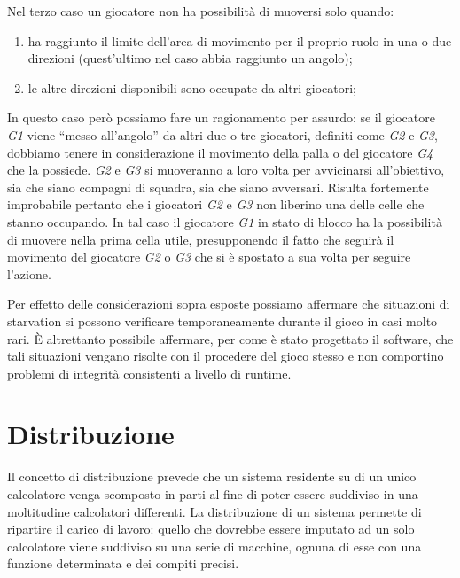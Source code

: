 \documentclass[aps,letterpaper,10pt]{article}
\begin{document}
Nel terzo caso un giocatore non ha possibilit\`a di muoversi solo quando:

\begin{enumerate}
	\item ha raggiunto il limite dell'area di movimento per il proprio ruolo in una o due direzioni (quest'ultimo nel caso abbia raggiunto un angolo);
	\item le altre direzioni disponibili sono occupate da altri giocatori; 
\end{enumerate}

In questo caso per\`o possiamo fare un ragionamento per assurdo: se il giocatore \emph{G1} viene ``messo all'angolo'' da altri due o tre giocatori, definiti come \emph{G2} e \emph{G3}, dobbiamo tenere in considerazione il movimento della palla o del giocatore \emph{G4} che la possiede. \emph{G2} e \emph{G3} si muoveranno a loro volta per avvicinarsi all'obiettivo, sia che siano compagni di squadra, sia che siano avversari. Risulta fortemente improbabile pertanto che i giocatori \emph{G2} e \emph{G3} non liberino una delle celle che stanno occupando. In tal caso il giocatore \emph{G1} in stato di blocco ha la possibilit\`a di muovere nella prima cella utile, presupponendo il fatto che seguir\`a il movimento del giocatore \emph{G2} o \emph{G3} che si \`e spostato a sua volta per seguire l'azione. \vspace{3mm}

Per effetto delle considerazioni sopra esposte possiamo affermare che situazioni di starvation si possono verificare temporaneamente durante il gioco in casi molto rari. \`E altrettanto possibile affermare, per come \`e stato progettato il software, che tali situazioni vengano risolte con il procedere del gioco stesso e non comportino problemi di integrit\`a consistenti a livello di runtime.

\newpage

\section{Distribuzione}

Il concetto di distribuzione prevede che un sistema residente su di un unico calcolatore venga scomposto in parti al fine di poter essere suddiviso in una moltitudine calcolatori differenti. La distribuzione di un sistema permette di ripartire il carico di lavoro: quello che dovrebbe essere imputato ad un solo calcolatore viene suddiviso su una serie di macchine, ognuna di esse con una funzione determinata e dei compiti precisi. \vspace{3mm}
\end{document}
